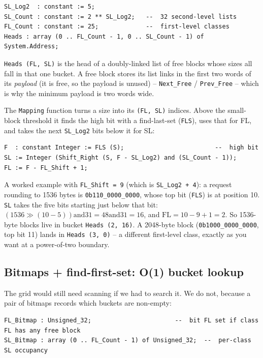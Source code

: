 \begin{lstlisting}
SL_Log2  : constant := 5;
SL_Count : constant := 2 ** SL_Log2;   --  32 second-level lists
FL_Count : constant := 25;             --  first-level classes
Heads : array (0 .. FL_Count - 1, 0 .. SL_Count - 1) of System.Address;
\end{lstlisting}

\texttt{Heads (FL, SL)} is the head of a doubly-linked list of free blocks whose
sizes all fall in that one bucket. A free block stores its list links in the first
two words of its \emph{payload} (it is free, so the payload is unused) --
\texttt{Next\_Free} / \texttt{Prev\_Free} -- which is why the minimum payload is
two words wide.

The \texttt{Mapping} function turns a size into its \texttt{(FL, SL)} indices.
Above the small-block threshold it finds the high bit with a find-last-set
(\texttt{FLS}), uses that for FL, and takes the next \texttt{SL\_Log2} bits below
it for SL:

\begin{lstlisting}
F  : constant Integer := FLS (S);                         --  high bit
SL := Integer (Shift_Right (S, F - SL_Log2) and (SL_Count - 1));
FL := F - FL_Shift + 1;
\end{lstlisting}

A worked example with \texttt{FL\_Shift = 9} (which is \texttt{SL\_Log2 + 4}): a
request rounding to 1536 bytes is \texttt{0b110\_0000\_0000}, whose top bit
(\texttt{FLS}) is at position 10. \texttt{SL} takes the five bits starting just
below that bit: $(1536 \gg (10-5)) \mathbin{\mathrm{and}} 31 = 48
\mathbin{\mathrm{and}} 31 = 16$, and $\mathrm{FL} = 10-9+1 = 2$. So 1536-byte
blocks live in bucket \texttt{Heads (2, 16)}. A 2048-byte block
(\texttt{0b1000\_0000\_0000}, top bit 11) lands in \texttt{Heads (3, 0)} -- a
different first-level class, exactly as you want at a power-of-two boundary.

\subsection{Bitmaps + find-first-set: O(1) bucket lookup}

The grid would still need scanning if we had to search it. We do not, because a
pair of bitmaps records which buckets are non-empty:

\begin{lstlisting}
FL_Bitmap : Unsigned_32;                       --  bit FL set if class FL has any free block
SL_Bitmap : array (0 .. FL_Count - 1) of Unsigned_32;  --  per-class SL occupancy
\end{lstlisting}

